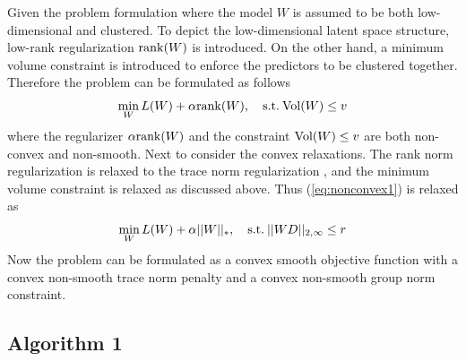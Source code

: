 \documentclass[twoside,leqno,twocolumn]{article}
\begin{document}
Given the problem formulation where the model $W$ is assumed to be both low-dimensional and clustered.
To depict the low-dimensional latent space structure, low-rank regularization ${\rm {rank}}(W)$
is introduced. On the other hand, a minimum volume constraint is introduced to enforce the predictors to be clustered together.
Therefore the problem can be formulated as follows
\begin{equation}
\mathop {\min }\limits_W L(W) + \alpha {\rm{rank}}(W),\quad{\rm{s.t.}}\:{\rm{Vol}}(W) \le v
\label{eq:nonconvex1}
\end{equation}
where the regularizer $\alpha{\rm {rank}}(W)$ and the constraint
${\rm {Vol(}}W{\rm {)}}\le v$ are both non-convex and non-smooth.
Next to consider the convex relaxations.
The rank norm regularization is relaxed to the trace norm regularization \cite{ji2009accelerated},
and the minimum volume constraint is relaxed as discussed
above. Thus (\ref{eq:nonconvex1}) is relaxed as
%
\begin{equation}
{\mathop {\min }\limits_W L(W) + \alpha ||W|{|_*},\quad{\rm{s.t.}}\:||WD|{|_{2,\infty }} \le r}
\label{eq:nc1-2}
\end{equation}
%
Now the problem can be formulated as a convex smooth objective function
with a convex non-smooth trace norm penalty and a convex non-smooth
group norm constraint. 

\subsection{Algorithm 1}
\end{document}

